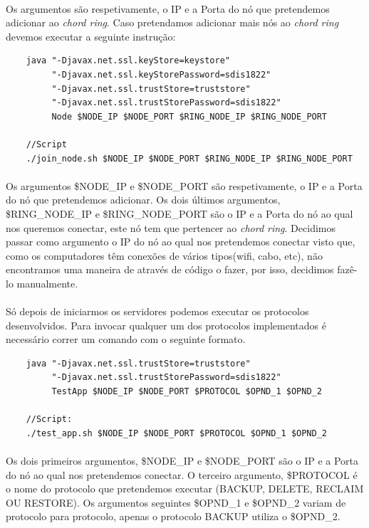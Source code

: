 \documentclass[11pt,oneside]{book}
\begin{document}
\paragraph{}
Os argumentos são respetivamente, o IP e a Porta do nó que pretendemos adicionar ao 
\textit{chord ring}. 
Caso pretendamos adicionar mais nós ao \textit{chord ring} devemos executar a seguinte
instrução:
\begin{lstlisting}
    java "-Djavax.net.ssl.keyStore=keystore" 
         "-Djavax.net.ssl.keyStorePassword=sdis1822" 
         "-Djavax.net.ssl.trustStore=truststore" 
         "-Djavax.net.ssl.trustStorePassword=sdis1822" 
         Node $NODE_IP $NODE_PORT $RING_NODE_IP $RING_NODE_PORT
    
    //Script
    ./join_node.sh $NODE_IP $NODE_PORT $RING_NODE_IP $RING_NODE_PORT
\end{lstlisting}

\paragraph{}
Os argumentos \$NODE\_IP e \$NODE\_PORT  são respetivamente, o IP e a Porta do nó que pretendemos
adicionar. Os dois últimos argumentos, \$RING\_NODE\_IP e \$RING\_NODE\_PORT são o IP e a Porta do
nó ao qual nos queremos conectar, este nó tem que pertencer ao \textit{chord ring}. 
Decidimos passar como argumento o IP do nó ao qual nos pretendemos conectar visto que, como os
computadores têm conexões de vários tipos(wifi, cabo, etc), não encontramos uma maneira de 
através de código o fazer, por isso, decidimos fazê-lo manualmente.

\paragraph{}
Só depois de iniciarmos os servidores podemos executar os protocolos desenvolvidos. Para invocar
qualquer um dos protocolos implementados é necessário correr um comando com o seguinte formato. 

\begin{lstlisting}
    java "-Djavax.net.ssl.trustStore=truststore" 
         "-Djavax.net.ssl.trustStorePassword=sdis1822" 
         TestApp $NODE_IP $NODE_PORT $PROTOCOL $OPND_1 $OPND_2
    
    //Script: 
    ./test_app.sh $NODE_IP $NODE_PORT $PROTOCOL $OPND_1 $OPND_2
\end{lstlisting}

\paragraph{}
Os dois primeiros argumentos, \$NODE\_IP e \$NODE\_PORT são o IP e a Porta do nó ao qual 
nos pretendemos conectar. O terceiro argumento, \$PROTOCOL  é o nome do protocolo que pretendemos
executar (BACKUP, DELETE, RECLAIM OU RESTORE). Os argumentos seguintes \$OPND\_1 e \$OPND\_2 
variam de protocolo para protocolo, apenas o protocolo BACKUP utiliza o \$OPND\_2.
\end{document}
